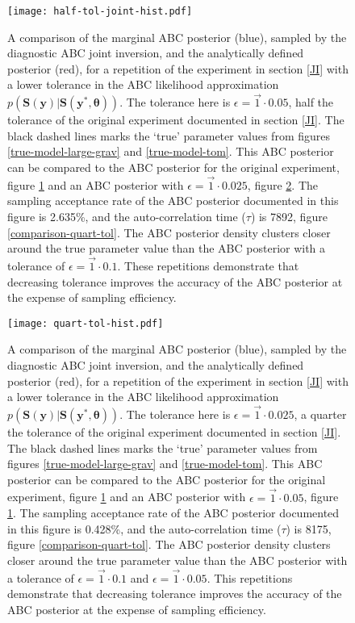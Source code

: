 \begin{figure}[H]
	\centering
	\texttt{[image: half-tol-joint-hist.pdf]}
	\caption{A comparison of the marginal ABC posterior (blue), sampled by the diagnostic ABC joint inversion, and the analytically defined posterior (red), for a repetition of the experiment in section \ref{JI} with a lower tolerance in the ABC likelihood approximation $p(\bm{S}(\bm{y})|\bm{S}(\bm{y^*},\bm{\theta}))$. The tolerance here is $\epsilon = \vec{1}\cdot0.05$, half the tolerance of the original experiment documented in section \ref{JI}. The black dashed lines marks the `true' parameter values from figures \ref{true-model-large-grav} and \ref{true-model-tom}. This ABC posterior can be compared to the ABC posterior for the original experiment, figure \ref{pdf-half-tol} and an ABC posterior with $\epsilon = \vec{1}\cdot0.025$, figure \ref{pdf-quart-tol}. The sampling acceptance rate of the ABC posterior documented in this figure is 2.635\%, and the auto-correlation time ($\tau$) is 7892, figure \ref{comparison-quart-tol}. The ABC posterior density clusters closer around the true parameter value than the ABC posterior with a tolerance of $\epsilon = \vec{1}\cdot0.1$. These repetitions demonstrate that decreasing tolerance improves the accuracy of the ABC posterior at the expense of sampling efficiency.}
	\label{pdf-half-tol}
\end{figure}

\begin{figure}[H]
	\centering
	\texttt{[image: quart-tol-hist.pdf]}
	\caption{A comparison of the marginal ABC posterior (blue), sampled by the diagnostic ABC joint inversion, and the analytically defined posterior (red), for a repetition of the experiment in section \ref{JI} with a lower tolerance in the ABC likelihood approximation $p(\bm{S}(\bm{y})|\bm{S}(\bm{y^*},\bm{\theta}))$. The tolerance here is $\epsilon = \vec{1}\cdot0.025$, a quarter the tolerance of the original experiment documented in section \ref{JI}. The black dashed lines marks the `true' parameter values from figures \ref{true-model-large-grav} and \ref{true-model-tom}. This ABC posterior can be compared to the ABC posterior for the original experiment, figure \ref{pdf-half-tol} and an ABC posterior with $\epsilon = \vec{1}\cdot0.05$, figure \ref{pdf-half-tol}. The sampling acceptance rate of the ABC posterior documented in this figure is 0.428\%, and the auto-correlation time ($\tau$) is 8175, figure \ref{comparison-quart-tol}. The ABC posterior density clusters closer around the true parameter value than the ABC posterior with a tolerance of $\epsilon = \vec{1}\cdot0.1$ and $\epsilon = \vec{1}\cdot0.05$. This repetitions demonstrate that decreasing tolerance improves the accuracy of the ABC posterior at the expense of sampling efficiency.}
	\label{pdf-quart-tol}
\end{figure}

